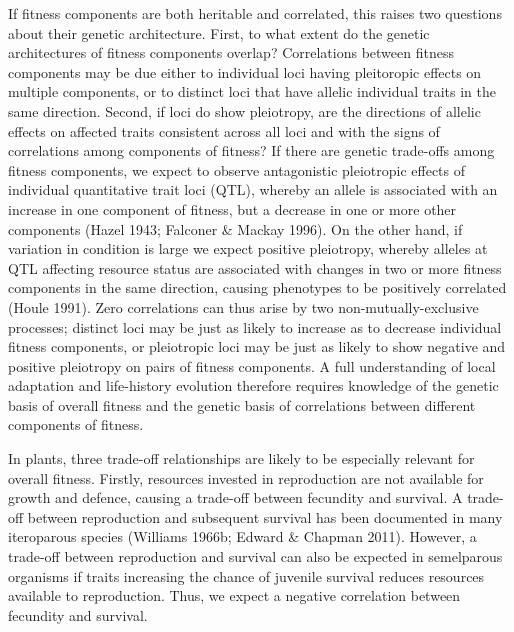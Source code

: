 \documentclass[]{article}
\begin{document}
If fitness components are both heritable and correlated, this raises two questions about their genetic architecture. First, to what extent do the genetic architectures of fitness components overlap? Correlations between fitness components may be due either to individual loci having pleitoropic effects on multiple components, or to distinct loci that have allelic individual traits in the same direction. Second, if loci do show pleiotropy, are the directions of allelic effects on affected traits consistent across all loci and with the signs of correlations among components of fitness? If there are genetic trade-offs among fitness components, we expect to observe antagonistic pleiotropic effects of individual quantitative trait loci (QTL), whereby an allele is associated with an increase in one component of fitness, but a decrease in one or more other components (Hazel 1943; Falconer \& Mackay 1996). On the other hand, if variation in condition is large we expect positive pleiotropy, whereby alleles at QTL affecting resource status are associated with changes in two or more fitness components in the same direction, causing phenotypes to be positively correlated (Houle 1991). Zero correlations can thus arise by two non-mutually-exclusive processes; distinct loci may be just as likely to increase as to decrease individual fitness components, or pleiotropic loci may be just as likely to show negative and positive pleiotropy on pairs of fitness components. A full understanding of local adaptation and life-history evolution therefore requires knowledge of the genetic basis of overall fitness and the genetic basis of correlations between different components of fitness.

In plants, three trade-off relationships are likely to be especially relevant for overall fitness. Firstly, resources invested in reproduction are not available for growth and defence, causing a trade-off between fecundity and survival. A trade-off between reproduction and subsequent survival has been documented in many iteroparous species (Williams 1966b; Edward \& Chapman 2011). However, a trade-off between reproduction and survival can also be expected in semelparous organisms if traits increasing the chance of juvenile survival reduces resources available to reproduction. Thus, we expect a negative correlation between fecundity and survival.
\end{document}
